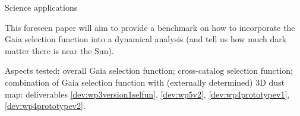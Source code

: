 \begin{workpackage}{Science applications}
\begin{wpobjectives}
\begin{description}
{        This foreseen paper will aim  to provide a benchmark on how to incorporate the Gaia selection function into a dynamical analysis (and tell us how much dark matter there is near the Sun).
        
        \textsf{Aspects tested: overall Gaia selection function; cross-catalog selection function; combination of Gaia selection function with (externally determined) 3D dust map: deliverables \ref{dev:wp3version1selfun}, \ref{dev:wp5v2}, \ref{dev:wp4prototypev1}, \ref{dev:wp4prototypev2}.}    
    }
      
      
        
      

\end{description}
\end{wpobjectives}
\end{workpackage}
